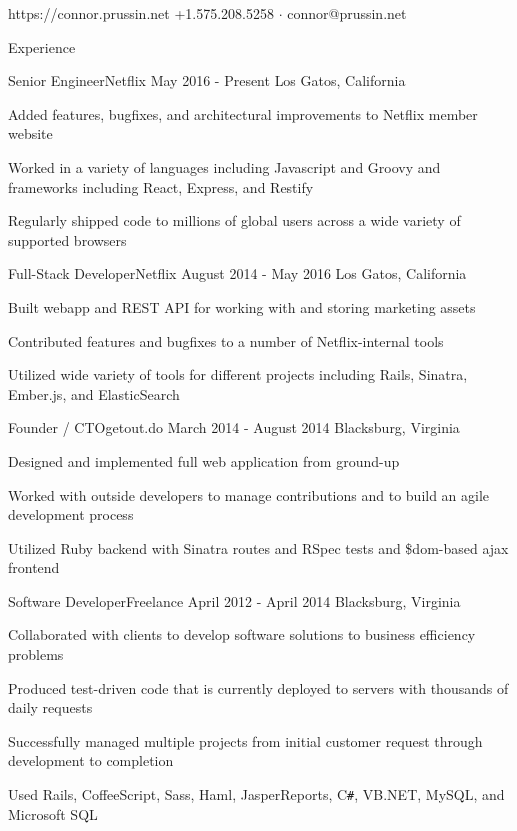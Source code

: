 \documentclass{resume}
\begin{document}
	           {https://connor.prussin.net}
	           {+1.575.208.5258 $\cdot$ connor@prussin.net}

	\begin{section}{Experience}
		\begin{experience}{Senior Engineer}{Netflix}
		                  {May 2016 - Present} %
		                  {Los Gatos, California}
			\item Added features, bugfixes, and architectural improvements to Netflix
			      member website
			\item Worked in a variety of languages including Javascript and Groovy and
			      frameworks including React, Express, and Restify
			\item Regularly shipped code to millions of global users across a wide
			      variety of supported browsers
		\end{experience}

		\begin{experience}{Full-Stack Developer}{Netflix}
		                  {August 2014 - May 2016} %
		                  {Los Gatos, California}
			\item Built webapp and REST API for working with and storing marketing
			      assets
			\item Contributed features and bugfixes to a number of Netflix-internal
			      tools
			\item Utilized wide variety of tools for different projects including
			      Rails, Sinatra, Ember.js, and ElasticSearch
		\end{experience}

		\begin{experience}{Founder / CTO}{getout.do}
		                  {March 2014 - August 2014} %
		                  {Blacksburg, Virginia}
			\item Designed and implemented full web application from ground-up
			\item Worked with outside developers to manage contributions and to build
			      an agile development process
			\item Utilized Ruby backend with Sinatra routes and RSpec tests and
			      \$dom-based ajax frontend
		\end{experience}

		\begin{experience}{Software Developer}{Freelance}
		                  {April 2012 - April 2014} %
		                  {Blacksburg, Virginia}
			\item Collaborated with clients to develop software solutions to business
			      efficiency problems
			\item Produced test-driven code that is currently deployed to servers
			      with thousands of daily requests
			\item Successfully managed multiple projects from initial customer
			      request through development to completion
			\item Used Rails, CoffeeScript, Sass, Haml, JasperReports, C\texttt{\#},
			      VB.NET, MySQL, and Microsoft SQL
		\end{experience}


\end{section}
\end{document}
